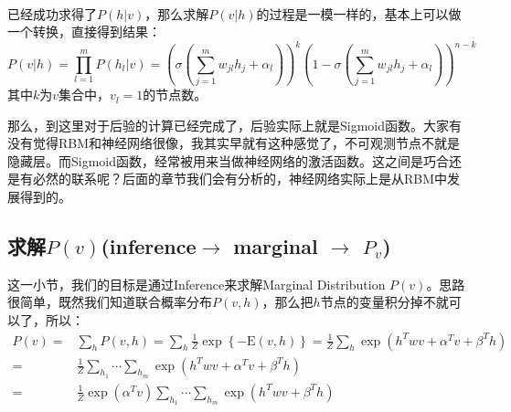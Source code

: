 \documentclass[a4paper]{article}
\begin{document}
~\\

已经成功求得了$P(h|v)$，那么求解$P(v|h)$的过程是一模一样的，基本上可以做一个转换，直接得到结果：
\begin{equation}
    P(v|h) = \prod_{l=1}^m P(h_l|v) = \left( \sigma\left(\sum_{j=1}^m w_{jl}h_j + \alpha_l\right) \right)^k\left(1-\sigma\left(\sum_{j=1}^m w_{jl}h_j + \alpha_l\right)\right)^{n-k}
\end{equation}
其中$k$为$v$集合中，$v_l=1$的节点数。

那么，到这里对于后验的计算已经完成了，后验实际上就是Sigmoid函数。大家有没有觉得RBM和神经网络很像，我其实早就有这种感觉了，不可观测节点不就是隐藏层。而Sigmoid函数，经常被用来当做神经网络的激活函数。这之间是巧合还是有必然的联系呢？后面的章节我们会有分析的，神经网络实际上是从RBM中发展得到的。

\subsection{求解$P(v)$(inference$\rightarrow$ marginal $\rightarrow$ $P_{v}$)}
这一小节，我们的目标是通过Inference来求解Marginal Distribution $P(v)$。思路很简单，既然我们知道联合概率分布$P(v,h)$，那么把$h$节点的变量积分掉不就可以了，所以：
\begin{equation}
\begin{split}
    P(v) = & \sum_h P(v,h) = \sum_h \frac{1}{Z} \exp \left\{ -\mathrm{E}(v,h) \right\} = \frac{1}{Z} \sum_h  \exp (h^T w v + \alpha^T v + \beta^T h ) \\
    = & \frac{1}{Z} \sum_{h_1}\cdots \sum_{h_m} \exp (h^T w v + \alpha^T v + \beta^T h )\\
    = & \frac{1}{Z} \exp(\alpha^T v) \sum_{h_1}\cdots \sum_{h_m} \exp (h^T w v + \beta^T h )\\
\end{split}
\end{equation}
\end{document}
